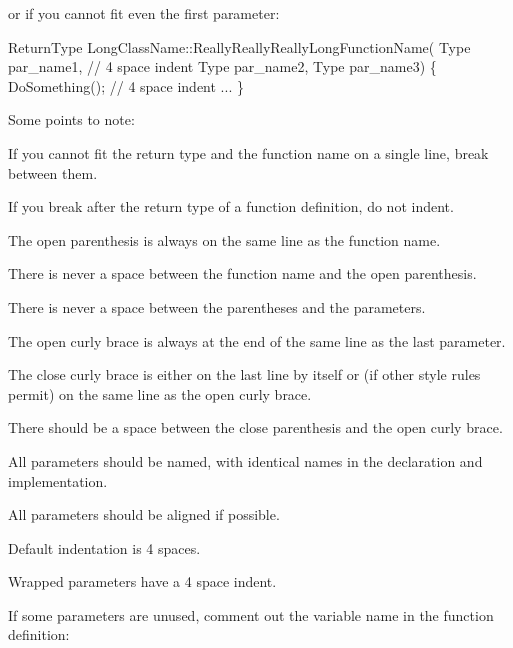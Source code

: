 or if you cannot fit even the first parameter\+:


\begin{DoxyCode}
ReturnType LongClassName::ReallyReallyReallyLongFunctionName(
    Type par\_name1,  \textcolor{comment}{// 4 space indent}
    Type par\_name2,
    Type par\_name3)
\{
    DoSomething();  \textcolor{comment}{// 4 space indent}
    ...
\}
\end{DoxyCode}


Some points to note\+:


\begin{DoxyItemize}
\item If you cannot fit the return type and the function name on a single line, break between them.
\item If you break after the return type of a function definition, do not indent.
\item The open parenthesis is always on the same line as the function name.
\item There is never a space between the function name and the open parenthesis.
\item There is never a space between the parentheses and the parameters.
\item The open curly brace is always at the end of the same line as the last parameter.
\item The close curly brace is either on the last line by itself or (if other style rules permit) on the same line as the open curly brace.
\item There should be a space between the close parenthesis and the open curly brace.
\item All parameters should be named, with identical names in the declaration and implementation.
\item All parameters should be aligned if possible.
\item Default indentation is 4 spaces.
\item Wrapped parameters have a 4 space indent.
\end{DoxyItemize}

If some parameters are unused, comment out the variable name in the function definition\+:


